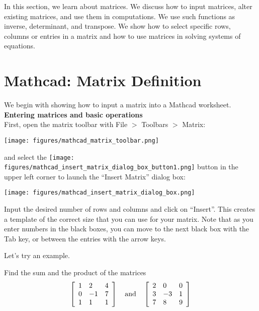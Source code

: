 In this section, we learn about matrices.  We discuss how to input matrices, alter existing matrices, and use them in computations.  We use such functions as inverse, determinant, and transpose.  We show how to select specific rows, columns or entries in a matrix and how to use matrices in solving systems of equations.  

\section{Mathcad: Matrix Definition}\label{sec:Mathcad_matrices}

We begin with showing how to input a matrix into a Mathcad worksheet.\\

\noindent \large \textsf{\textbf{Entering matrices and basic operations}} \normalsize\\

First, open the matrix toolbar with File $>$ Toolbars $>$ Matrix:

\begin{center}
\texttt{[image: figures/mathcad\_matrix\_toolbar.png]}
\end{center}

and select the  \texttt{[image: figures/mathcad\_insert\_matrix\_dialog\_box\_button1.png]} button in the upper left corner to launch the ``Insert Matrix'' dialog box:

\begin{center}
\texttt{[image: figures/mathcad\_insert\_matrix\_dialog\_box.png]}
\end{center}

Input the desired number of rows and columns and click on ``Insert''. This creates a template of the correct size that you can use for your matrix.  Note that as you enter numbers in the black boxes, you can move to the next black box with the Tab key, or between the entries with the arrow keys.

Let's try an example.

Find the sum and the product of the matrices 
\[
\left[
\begin{array}{lll}
1 & 2 & 4\\
0 & -1 & 7\\
1 & 1 & 1
\end{array}
\right]
\quad
{\rm and}
\quad
\left[
\begin{array}{lll}
2 & 0 & 0\\
3 & -3 & 1\\
7 & 8 & 9
\end{array}
\right]
\]

